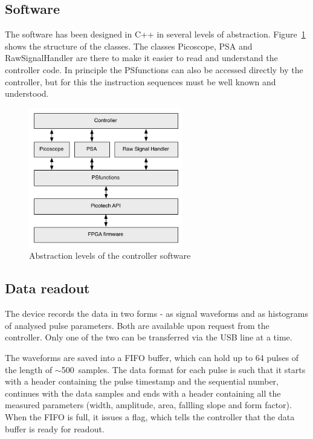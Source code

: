 \documentclass[12pt]{packages/mytustyle}  %
\begin{document}
\subsection{Software}
The software has been designed in C++ in several levels of abstraction. Figure~\ref{fig:controller} shows the structure of the classes. The classes Picoscope, PSA and RawSignalHandler are there to make it easier to read and understand the controller code. In principle the PSfunctions can also be accessed directly by the controller, but for this the instruction sequences must be well known and understood. 

\begin{figure}[!ht]
\centering
\includegraphics[width=0.6\textwidth]{plots/controller}
\caption{Abstraction levels of the controller software}
\label{fig:controller}
\end{figure}

\subsection{Data readout}
The device records the data in two forms - as signal waveforms and as histograms of analysed pulse parameters. Both are available upon request from the controller. Only one of the two can be transferred via the USB line at a time. 

The waveforms are saved into a FIFO buffer, which can hold up to 64 pulses of the length of $\sim$500~samples. The data format for each pulse is such that it starts with a header containing the pulse timestamp and the sequential number, continues with the data samples and ends with a header containing all the measured parameters (width, amplitude, area, fallling slope and form factor). When the FIFO is full, it issues a flag, which tells the controller that the data buffer is ready for readout. 
\end{document}
